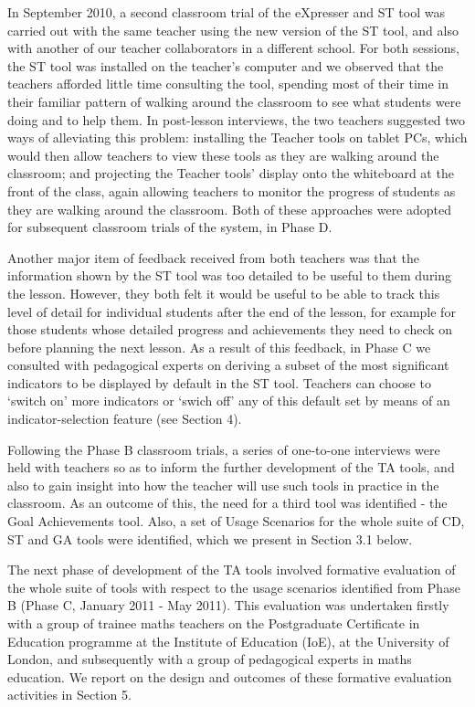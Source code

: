 In September 2010, a second classroom trial of the eXpresser and ST
tool was carried out with the same teacher using the new version of
the ST tool, and also with another of our teacher collaborators in a
different school. For both sessions, the ST tool was installed on the
teacher's computer and we observed that the teachers afforded little
time consulting the tool, spending most of their time in their
familiar pattern of walking around the classroom to see what students
were doing and to help them. In post-lesson interviews, the two
teachers suggested two ways of alleviating this problem: installing
the Teacher tools on tablet PCs, which would then allow teachers to
view these tools as they are walking around the classroom; and
projecting the Teacher tools' display onto the whiteboard at the front
of the class, again allowing teachers to monitor the progress of
students as they are walking around the classroom. Both of these
approaches were adopted for subsequent classroom trials of the system,
in Phase D.
 
Another major item of feedback received from both teachers was that
the information shown by the ST tool was too detailed to be useful to
them during the lesson. However, they both felt it would be useful to
be able to track this level of detail for individual students after
the end of the lesson, for example for those students whose detailed
progress and achievements they need to check on before planning the
next lesson. As a result of this feedback, in Phase C we consulted
with pedagogical experts on deriving a subset of the most significant
indicators to be displayed by default in the ST tool. Teachers can
choose to `switch on' more indicators or `swich off' any of this
default set by means of an indicator-selection feature (see Section
4).

Following the Phase B classroom trials, a series of one-to-one
interviews were held with teachers so as to inform the further
development of the TA tools, and also to gain insight into how the
teacher will use such tools in practice in the classroom. As an
outcome of this, the need for a third tool was identified - the Goal
Achievements tool. Also, a set of Usage Scenarios for the whole suite
of CD, ST and GA tools were identified, which we present in Section
3.1 below.

The next phase of development of the TA tools involved formative
evaluation of the whole suite of tools with respect to the usage
scenarios identified from Phase B (Phase C, January 2011 - May
2011). This evaluation was undertaken firstly with a group of trainee
maths teachers on the Postgraduate Certificate in Education programme
at the Institute of Education (IoE), at the University of London, and
subsequently with a group of pedagogical experts in maths
education. We report on the design and outcomes of these formative
evaluation activities in Section 5.
 
